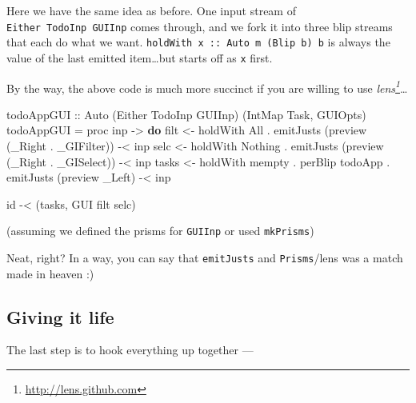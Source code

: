 \documentclass[]{article}
\newenvironment{Shaded}{}{}
\newcommand{\DataTypeTok}[1]{\textcolor[rgb]{0.56,0.13,0.00}{#1}}
\newcommand{\FunctionTok}[1]{\textcolor[rgb]{0.02,0.16,0.49}{#1}}
\newcommand{\KeywordTok}[1]{\textcolor[rgb]{0.00,0.44,0.13}{\textbf{#1}}}
\newcommand{\NormalTok}[1]{#1}
\newcommand{\OperatorTok}[1]{\textcolor[rgb]{0.40,0.40,0.40}{#1}}
\newcommand{\OtherTok}[1]{\textcolor[rgb]{0.00,0.44,0.13}{#1}}
\renewcommand{\href}[2]{#2\footnote{\url{#1}}}
\begin{document}
Here we have the same idea as before. One input stream of
\texttt{Either\ TodoInp\ GUIInp} comes through, and we fork it into three blip
streams that each do what we want.
\texttt{holdWith\ x\ ::\ Auto\ m\ (Blip\ b)\ b} is always the value of the last
emitted item\ldots but starts off as \texttt{x} first.

By the way, the above code is much more succinct if you are willing to use
\emph{\href{http://lens.github.com}{lens}}\ldots{}

\begin{Shaded}
\begin{Highlighting}[]
\OtherTok{todoAppGUI ::} \DataTypeTok{Auto\textquotesingle{}}\NormalTok{ (}\DataTypeTok{Either} \DataTypeTok{TodoInp} \DataTypeTok{GUIInp}\NormalTok{) (}\DataTypeTok{IntMap} \DataTypeTok{Task}\NormalTok{, }\DataTypeTok{GUIOpts}\NormalTok{)}
\NormalTok{todoAppGUI }\OtherTok{=}\NormalTok{ proc inp }\OtherTok{{-}\textgreater{}} \KeywordTok{do}
\NormalTok{    filt  }\OtherTok{\textless{}{-}}\NormalTok{ holdWith }\DataTypeTok{All}
           \OperatorTok{.}\NormalTok{ emitJusts (preview (\_Right }\OperatorTok{.}\NormalTok{ \_GIFilter)) }\OperatorTok{{-}\textless{}}\NormalTok{ inp}
\NormalTok{    selc  }\OtherTok{\textless{}{-}}\NormalTok{ holdWith }\DataTypeTok{Nothing}
           \OperatorTok{.}\NormalTok{ emitJusts (preview (\_Right }\OperatorTok{.}\NormalTok{ \_GISelect)) }\OperatorTok{{-}\textless{}}\NormalTok{ inp}
\NormalTok{    tasks }\OtherTok{\textless{}{-}}\NormalTok{ holdWith }\FunctionTok{mempty} \OperatorTok{.}\NormalTok{ perBlip todoApp}
           \OperatorTok{.}\NormalTok{ emitJusts (preview \_Left)                }\OperatorTok{{-}\textless{}}\NormalTok{ inp}

    \FunctionTok{id} \OperatorTok{{-}\textless{}}\NormalTok{ (tasks, }\DataTypeTok{GUI}\NormalTok{ filt selc)}
\end{Highlighting}
\end{Shaded}

(assuming we defined the prisms for \texttt{GUIInp} or used
\texttt{\textquotesingle{}\textquotesingle{}mkPrisms})

Neat, right? In a way, you can say that \texttt{emitJusts} and
\texttt{Prisms}/lens was a match made in heaven :)

\subsection{Giving it life}\label{giving-it-life}

The last step is to hook everything up together ---
\end{document}
